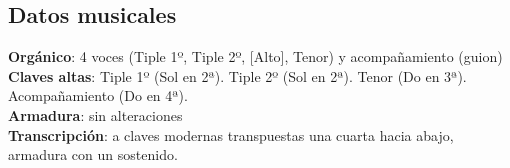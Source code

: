 \subsection*{Datos musicales}
\noindent \textbf{Orgánico}: 4 voces (Tiple 1º, Tiple 2º, [Alto], Tenor) y acompañamiento (guion)\\
\textbf{Claves altas}: Tiple 1º (Sol en 2ª). Tiple 2º (Sol en 2ª). Tenor (Do en 3ª). Acompañamiento (Do en 4ª).\\
\textbf{Armadura}: sin alteraciones\\
\textbf{Transcripción}: a claves modernas transpuestas una cuarta hacia abajo, armadura con un sostenido.

